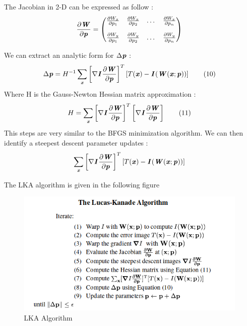 \documentclass[a4paper,12pt]{report}
\newcommand{\bepar}[1]{
	\left( #1 \right)  
}
\newcommand{\becro}[1]{
	\left[ #1 \right]  
}
\numberwithin{equation}{section} %
\begin{document}
The Jacobian in 2-D can be expressed as follow :
\begin{equation*}
\frac{\partial \textbf{\textit{W}}}{\partial \textbf{\textit{p}}} =
	\begin{pmatrix} 
    	\frac{\partial W_x}{\partial p_1} & \frac{\partial W_x}{\partial p_2} & \dots & 		\frac{\partial W_x}{\partial p_n}\\[4mm]
    	\frac{\partial W_y}{\partial p_1} & \frac{\partial W_y}{\partial p_2} & \dots & 		\frac{\partial W_y}{\partial p_n}\\
    \end{pmatrix}
\end{equation*}

We can extract an analytic form for $\Delta\textbf{\textit{p}}$ :
\begin{equation*}
\Delta\textbf{\textit{p}} = H^{-1} \sum_\textbf{\textit{x}} \becro{\nabla \textit{\textbf{I}}\,\frac{\partial\textbf{\textit{W}}}{\partial \textbf{\textit{p}}}}^T \becro{T(\textbf{\textit{x}}) - \textit{\textbf{I}}\bepar{\textbf{\textit{W}}(\textbf{\textit{x}}; \textbf{\textit{p}})}} \tag{10}
\end{equation*}
Where  H is the Gauss-Newton Hessian matrix approximation :
\begin{equation*}
H = \sum_\textit{\textbf{x}} \becro{\nabla \textit{\textbf{I}}\,\frac{\partial\textbf{\textit{W}}}{\partial \textbf{\textit{p}}}}^T \becro{\nabla \textit{\textbf{I}}\,\frac{\partial\textbf{\textit{W}}}{\partial \textbf{\textit{p}}}} \tag{11}
\end{equation*}
This steps are very similar to the BFGS minimization algorithm. We can then identify a steepest descent parameter updates :
\begin{equation*}
\sum_\textbf{\textit{x}} \becro{\nabla \textit{\textbf{I}}\,\frac{\partial\textbf{\textit{W}}}{\partial \textbf{\textit{p}}}}^T \becro{T(\textbf{\textit{x}}) - \textit{\textbf{I}}\bepar{\textbf{\textit{W}}(\textbf{\textit{x}}; \textbf{\textit{p}})}}
\end{equation*}

The LKA algorithm is given in the following figure 
\begin{figure}[!ht]
\centering
\includegraphics[scale=0.6]{LKA.png}
\captionsetup{labelformat=empty}
\caption{LKA Algorithm}
\end{figure}
\newpage
\end{document}
